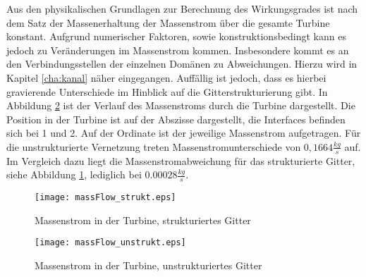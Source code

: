 Aus den physikalischen Grundlagen zur Berechnung des Wirkungsgrades ist nach dem Satz der Massenerhaltung der Massenstrom über die gesamte Turbine konstant.
Aufgrund numerischer Faktoren, sowie konstruktionsbedingt kann es jedoch zu Veränderungen im Massenstrom kommen. 
Insbesondere kommt es an den Verbindungsstellen der einzelnen Domänen zu Abweichungen. Hierzu wird in Kapitel \ref{cha:kanal} näher eingegangen.
Auffällig ist jedoch, dass es hierbei gravierende Unterschiede im Hinblick auf die Gitterstrukturierung gibt. In Abbildung \ref{fig:massFlowUnstrukt} ist der Verlauf des Massenstroms durch die Turbine dargestellt. Die Position in der Turbine ist auf der Abszisse dargestellt, die Interfaces befinden sich bei 1 und 2. Auf der Ordinate ist der jeweilige Massenstrom aufgetragen. Für die unstrukturierte Vernetzung treten Massenstromunterschiede von $0,1664 \frac{kg}{s}$ auf. Im Vergleich dazu liegt die Massenstromabweichung für das strukturierte Gitter, siehe Abbildung \ref{fig:massFlowStrukt}, lediglich bei $0.00028\frac{kg}{s}$.

 \begin{figure}[htbp]
	\centering
	\texttt{[image: massFlow\_strukt.eps]}
	\caption{Massenstrom in der Turbine, strukturiertes Gitter} \label{fig:massFlowStrukt}
\end{figure} 
 \begin{figure}[htbp]
	\centering
	\texttt{[image: massFlow\_unstrukt.eps]}
	\caption{Massenstrom in der Turbine, unstrukturiertes Gitter} \label{fig:massFlowUnstrukt}
\end{figure} 
